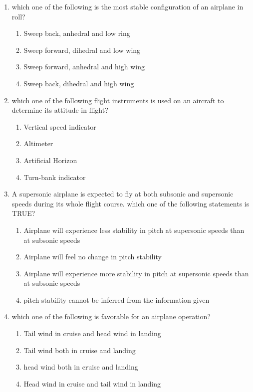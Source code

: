 \documentclass[journal,12pt,onecolumn]{IEEEtran}
\theoremstyle{remark}
\begin{document}
\begin{enumerate}
\item which one of the following is the most stable configuration of an airplane in roll?
\begin{enumerate}
    \item Sweep back, anhedral and low ring
    \item Sweep forward, dihedral and low wing
    \item Sweep forward, anhedral and high wing
    \item Sweep back, dihedral and high wing \\
\end{enumerate}

\item which one of the following flight instruments is used on an aircraft to determine its attitude in flight?
\begin{enumerate}
    \item Vertical speed indicator
    \item Altimeter
    \item Artificial Horizon
    \item Turn-bank indicator \\
\end{enumerate}

\item A supersonic airplane is expected to fly at both subsonic and supersonic speeds during its whole flight course. which one of the following statements is TRUE?
\begin{enumerate}
    \item Airplane will experience less stability in pitch at supersonic speeds than at subsonic speeds
    \item Airplane will feel no change in pitch stability
    \item Airplane will experience more stability in pitch at supersonic speeds than at subsonic speeds
    \item pitch stability cannot be inferred from the information given \\
\end{enumerate}

\item which one of the following is favorable for an airplane operation?
\begin{enumerate}
    \item Tail wind in cruise and head wind in landing
    \item Tail wind both in cruise and landing
    \item head wind both in cruise and landing
    \item Head wind in cruise and tail wind in landing \\
\end{enumerate}


\end{enumerate}
\end{document}
